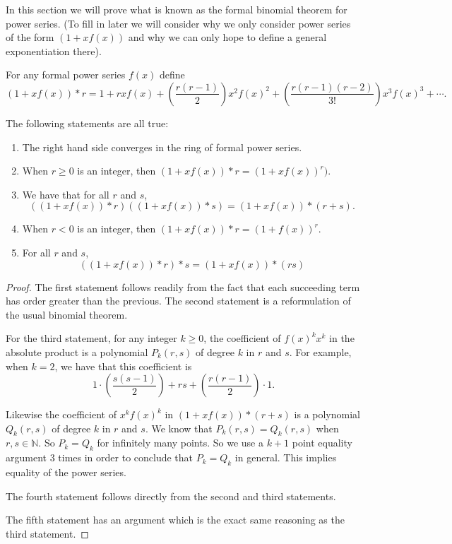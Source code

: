 In this section we will prove what is known as the formal binomial theorem for power series. (To fill in later we will consider why we only consider power series of the form $(1 + xf(x))$ and why we can only hope to define a general exponentiation there).

For any formal power series $f(x)$ define 
\[(1  + xf(x))*r = 1 + rxf(x) + \left(\frac{r(r-1)}{2}\right)x^2f(x)^2 + \left(\frac{r(r-1)(r-2)}{3!}\right)x^3f(x)^3 + \cdots.\]

\begin{theorem}
The following statements are all true:
\begin{enumerate}
  \item The right hand side converges in the ring of formal power series.
  \item When $r \geq 0$ is an integer, then $(1 + xf(x))*r = (1 + xf(x))^r)$.
  \item We have that for all $r$ and $s$,
  \[((1 + xf(x))*r)((1 + xf(x)) * s) = (1 + xf(x))*(r + s).\]
  \item When $r < 0$ is an integer, then $(1 + xf(x))*r = (1 + f(x))^r$.
  \item For all $r$ and $s$, \[((1 + xf(x))*r)*s = (1 + xf(x))*(rs)\]
\end{enumerate}
\end{theorem}

\begin{proof}
The first statement follows readily from the fact that each succeeding term has order greater than the previous. The second statement is a reformulation of the usual binomial theorem.

For the third statement, for any integer $k \geq 0$, the coefficient of $f(x)^kx^k$ in the absolute product is a polynomial $P_k(r,s)$ of degree $k$ in $r$ and $s$. For example, when $k = 2$, we have that this coefficient is
\[1\cdot\left(\frac{s(s-1)}{2}\right) + rs + \left(\frac{r(r-1)}{2}\right)\cdot 1.\]

Likewise the coefficient of $x^kf(x)^k$ in $(1 + xf(x))*(r + s)$ is a polynomial $Q_k(r,s)$ of degree $k$ in $r$ and $s$. We know that $P_k(r, s) = Q_k(r, s)$ when $r, s \in \mathbb{N}$. So $P_k = Q_k$ for infinitely many points. So we use a $k + 1$ point equality argument $3$ times in order to conclude that $P_k = Q_k$ in general. This implies equality of the power series.

The fourth statement follows directly from the second and third statements.

The fifth statement has an argument which is the exact same reasoning as the third statement.

\end{proof}

